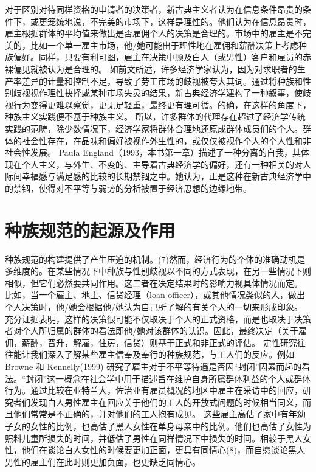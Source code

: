 \documentclass[UTF8]{ctexart}
\begin{document}
对于区别对待同样资格的申请者的决策者，新古典主义者认为在信息条件昂贵的条件下，或更笼统地说，不完美的市场下，这样是理性的。他们认为在信息昂贵时，雇主根据群体的平均值来做出是否雇佣个人的决策是合理的。市场中的雇主是不完美的，比如一个单一雇主市场，他/她可能出于理性地在雇佣和薪酬决策上考虑种族偏好。同样，只要有利可图，雇主在决策中顾及白人（或男性）客户和雇员的赤裸偏见就被认为是合理的。
如前文所述，许多经济学家认为，因为对求职者的生产率差异的计量和控制不足，导致了劳工市场的歧视被夸大其词。通过将种族和性别歧视视作理性抉择或某种市场失灵的结果，新古典经济学建构了一种叙事，使歧视行为变得更难以察觉，更无足轻重，最终更有理可循。的确，在这样的角度下，种族主义实践便不基于种族主义。
所以，许多群体的代理存在超过了经济学传统实践的范畴，除少数情况下，经济学家将群体合理地还原成群体成员们的个人。群体的社会性存在，在品味和偏好被视作外生性的，或仅仅被视作个人的个人性和非社会性发展。
Paula England（1993，本书第一章）描述了一种分离的自我，其体现在个人主义，与外生、不变的、主导着古典经济学的偏好，还有一种相关的对人际间幸福感与满足感的比较的长期禁锢之中。她认为，正是这种在新古典经济学中的禁锢，使得对不平等与弱势的分析被置于经济思想的边缘地带。

\section{种族规范的起源及作用} 种族规范的构建提供了产生压迫的机制。(7)然而，经济行为的个体的准确动机是多维度的。在某些情况下中种族与性别歧视以不同的方式表现，在另一些情况下则相似，但它们必然要共同作用。这二者在决定结果时的影响力视具体情况而定。
比如，当一个雇主、地主、信贷经理（loan officer），或其他情况类似的人，做出个人决策时，他/她会根据他/她认为自己所了解的有关个人的一切来形成印象。 充分证据表明，这样的决策很可能不仅取决于个人的正式资格，而是也取决于决策者对个人所归属的群体的看法即他/她对该群体的认识。因此，最终决定（关于雇佣，薪酬，晋升，解雇，住房，信贷）则基于正式和非正式的评估。
定性研究往往能让我们深入了解某些雇主信奉及奉行的种族规范，与工人们的反应。例如 Browne 和 Kennelly(1999) 研究了雇主对于不平等待遇是否因“封闭”因素而起的看法。“封闭”这一概念在社会学中用于描述旨在维护自身所属群体利益的个人或群体行为。通过比较在亚特兰大，佐治亚有雇员概况的地区中雇主在采访中的回应，研究者们发现白人男性雇主在回应关于他们的工人的开放式问题的时候相当同义，而且他们常常是不正确的，并对他们的工人抱有成见。
这些雇主高估了家中有年幼子女的女性的比例，也高估了黑人女性在单身母亲中的比例。他们也高估了女性为照料儿童所损失的时间，并低估了男性在同样情况下中损失的时间。相较于黑人女性，他们在谈论白人女性的时候要更加正面，更具有同情心(8)，而自愿谈论黑人男性的雇主们在此时则更加负面，也更缺乏同情心。
\end{document}
